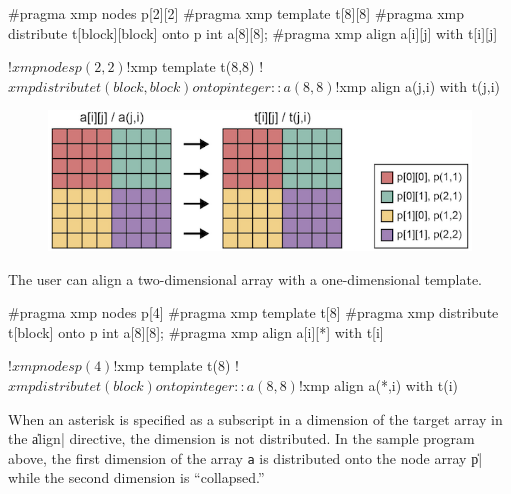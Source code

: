 \begin{XCexample}
#pragma xmp nodes p[2][2]
#pragma xmp template t[8][8]
#pragma xmp distribute t[block][block] onto p
int a[8][8];
#pragma xmp align a[i][j] with t[i][j]
\end{XCexample}

\begin{XFexample}
!$xmp nodes p(2,2)
!$xmp template t(8,8)
!$xmp distribute t(block,block) onto p
integer :: a(8,8)
!$xmp align a(j,i) with t(j,i)
\end{XFexample}

\begin{figure}
  \centering
  \includegraphics{figs/multi-dim.png}
\end{figure}



The user can align a two-dimensional array with a one-dimensional template.

\begin{XCexample}
#pragma xmp nodes p[4]
#pragma xmp template t[8]
#pragma xmp distribute t[block] onto p
int a[8][8];
#pragma xmp align a[i][*] with t[i]
\end{XCexample}

\begin{XFexample}
!$xmp nodes p(4)
!$xmp template t(8)
!$xmp distribute t(block) onto p
integer :: a(8,8)
!$xmp align a(*,i) with t(i)
\end{XFexample}

When an asterisk is specified as a subscript in a dimension of the
target array in the \|align| directive, the dimension is not
distributed. In the sample program above, the first dimension of the
array {\tt a} is distributed onto the node array \|p| while the second
dimension is ``collapsed.''

